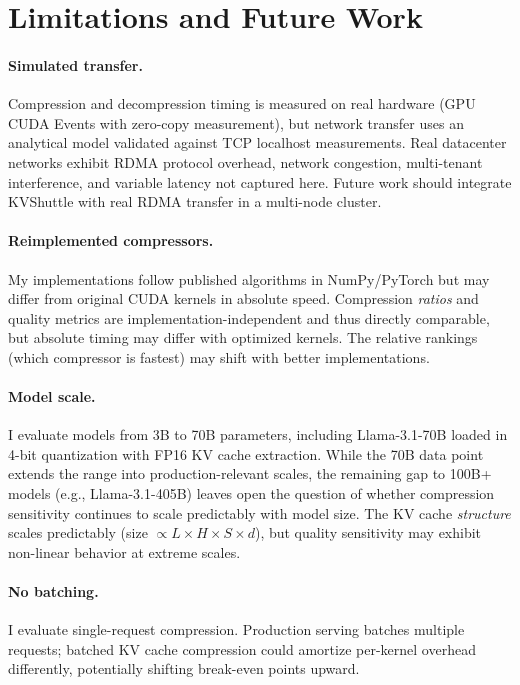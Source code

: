 \documentclass{article}
\begin{document}
\section{Limitations and Future Work}
\label{sec:limitations}

\paragraph{Simulated transfer.} Compression and decompression timing is measured on real hardware (GPU CUDA Events with zero-copy measurement), but network transfer uses an analytical model validated against TCP localhost measurements. Real datacenter networks exhibit RDMA protocol overhead, network congestion, multi-tenant interference, and variable latency not captured here. Future work should integrate KVShuttle with real RDMA transfer in a multi-node cluster.

\paragraph{Reimplemented compressors.} My implementations follow published algorithms in NumPy/PyTorch but may differ from original CUDA kernels in absolute speed. Compression \emph{ratios} and quality metrics are implementation-independent and thus directly comparable, but absolute timing may differ with optimized kernels. The relative rankings (which compressor is fastest) may shift with better implementations.

\paragraph{Model scale.} I evaluate models from 3B to 70B parameters, including Llama-3.1-70B loaded in 4-bit quantization with FP16 KV cache extraction. While the 70B data point extends the range into production-relevant scales, the remaining gap to 100B+ models (e.g., Llama-3.1-405B) leaves open the question of whether compression sensitivity continues to scale predictably with model size. The KV cache \emph{structure} scales predictably (size $\propto L \times H \times S \times d$), but quality sensitivity may exhibit non-linear behavior at extreme scales.

\paragraph{No batching.} I evaluate single-request compression. Production serving batches multiple requests; batched KV cache compression could amortize per-kernel overhead differently, potentially shifting break-even points upward.
\end{document}
